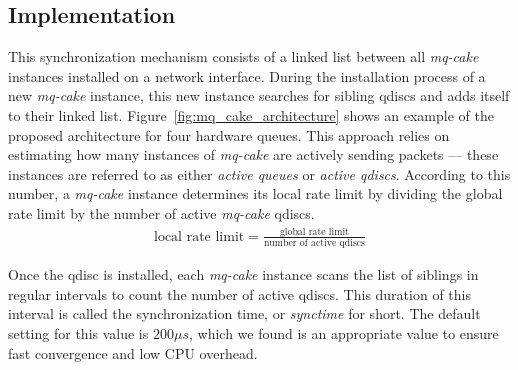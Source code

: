 \subsection{Implementation}
This synchronization mechanism consists of a linked list between all \textit{mq-cake} instances installed on a network interface.
%
During the installation process of a new \textit{mq-cake} instance, this new instance searches for sibling qdiscs and adds itself to their linked list.
%
Figure~\ref{fig:mq_cake_architecture} shows an example of the proposed architecture for four hardware queues.
This approach relies on estimating how many instances of \textit{mq-cake} are actively sending packets --- these instances are referred to as either \textit{active queues} or \textit{active qdiscs}.
%
According to this number, a \textit{mq-cake} instance determines its local rate limit by dividing the global rate limit by the number of active \textit{mq-cake} qdiscs.
%
\begin{align}
    \text{local rate limit} = \frac{\text{global rate limit}}{\text{number of active qdiscs}}
\end{align} 

Once the qdisc is installed, each \textit{mq-cake} instance scans the list of siblings in regular intervals to count the number of active qdiscs. 
%
This duration of this interval is called the synchronization time, or \textit{synctime} for short.
%
%
%
The default setting for this value is $200\mu s$, which we found is an appropriate value to ensure fast convergence and low CPU overhead. 
%

